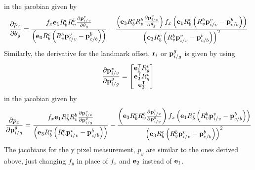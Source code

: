 in the jacobian given by
\begin{equation}
  \frac{\partial p_x}{\partial \theta_g} =
  \frac{f_x \boldsymbol{\mathrm{e}}_1 R_b^c R_v^b \frac{\partial \boldsymbol{\mathrm{p}}_{i/v}^v}{\partial \theta_g}}
    {\left(\boldsymbol{\mathrm{e}}_3 R_b^c \left(R_v^b \boldsymbol{\mathrm{p}}_{i/v}^v -
    \boldsymbol{\mathrm{p}}_{c/b}^b\right)\right)}
    - \frac{\left(\boldsymbol{\mathrm{e}}_3 R_b^c R_v^b \frac{\partial \boldsymbol{\mathrm{p}}_{i/v}^v}{\partial \theta_g} \right) f_x \left(\boldsymbol{\mathrm{e}}_1 R_b^c \left(R_v^b \boldsymbol{\mathrm{p}}_{i/v}^v -
        \boldsymbol{\mathrm{p}}_{c/b}^b\right)\right)} {\left(\boldsymbol{\mathrm{e}}_3 R_b^c \left(R_v^b \boldsymbol{\mathrm{p}}_{i/v}^v -
  \boldsymbol{\mathrm{p}}_{c/b}^b\right)\right)^2}
\end{equation}
Similarly, the derivative for the landmark offset, $\boldsymbol{\mathrm{r}}_i$ or
$\boldsymbol{\mathrm{p}}_{i/g}^g$ is given by using
\begin{equation}
  \frac{\partial \boldsymbol{\mathrm{p}}_{i/v}^v}{\partial \boldsymbol{\mathrm{p}}_{i/g}^g} =
  \begin{bmatrix}
    \boldsymbol{\mathrm{e}}_1^{\mathsf{T}} R_g^v \\
    \boldsymbol{\mathrm{e}}_2^{\mathsf{T}} R_g^v \\
    \boldsymbol{\mathrm{e}}_3^{\mathsf{T}}
  \end{bmatrix}
\end{equation}
in the jacobian given by
\begin{equation}
  \frac{\partial p_x}{\partial \boldsymbol{\mathrm{p}}_{i/g}^g} =
  \frac{f_x \boldsymbol{\mathrm{e}}_1 R_b^c R_v^b \frac{\partial \boldsymbol{\mathrm{p}}_{i/v}^v}{\partial \boldsymbol{\mathrm{p}}_{i/g}^g}}
    {\left(\boldsymbol{\mathrm{e}}_3 R_b^c \left(R_v^b \boldsymbol{\mathrm{p}}_{i/v}^v -
    \boldsymbol{\mathrm{p}}_{c/b}^b\right)\right)}
    - \frac{\left(\boldsymbol{\mathrm{e}}_3 R_b^c R_v^b \frac{\partial \boldsymbol{\mathrm{p}}_{i/v}^v}{\partial \boldsymbol{\mathrm{p}}_{i/g}^g} \right) f_x \left(\boldsymbol{\mathrm{e}}_1 R_b^c \left(R_v^b \boldsymbol{\mathrm{p}}_{i/v}^v -
        \boldsymbol{\mathrm{p}}_{c/b}^b\right)\right)} {\left(\boldsymbol{\mathrm{e}}_3 R_b^c \left(R_v^b \boldsymbol{\mathrm{p}}_{i/v}^v -
  \boldsymbol{\mathrm{p}}_{c/b}^b\right)\right)^2}
\end{equation}
The jacobians for the y pixel measurement, $p_y$ are similar to the ones derived
above, just changing $f_y$ in place of $f_x$ and $\boldsymbol{\mathrm{e}}_2$ instead of $\boldsymbol{\mathrm{e}}_1$.
